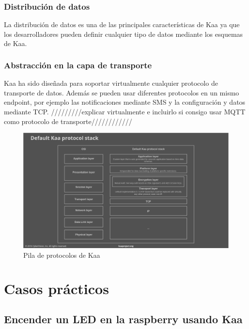 \documentclass[12pt, twoside]{book}
\begin{document}
\subsubsection*{Distribución de datos}
La distribución de datos es una de las principales características de Kaa ya que los desarrolladores pueden definir cualquier tipo de datos mediante los esquemas de Kaa.
\subsubsection*{Abstracción en la capa de transporte}
Kaa ha sido diseñada para soportar virtualmente cualquier protocolo de transporte de datos. Además se pueden usar diferentes protocolos en un mismo endpoint, por ejemplo las notificaciones mediante SMS y la configuración y datos mediante TCP. /////////explicar virtualmente e incluirlo si consigo usar MQTT como protocolo de transporte////////////
\begin{figure}[H]
\centering
\includegraphics[scale=0.4]{images/kaa_stack}
\caption{Pila de protocolos de Kaa}\label{L508}
\end{figure}
\section{Casos prácticos}

\subsection{Encender un LED en la raspberry usando Kaa}
\end{document}
